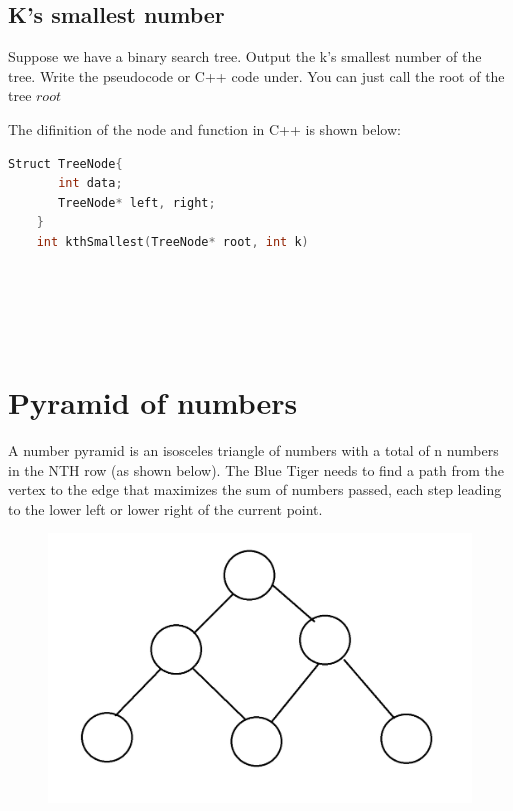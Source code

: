 \documentclass[11pt]{exam}
\begin{document}
    \subsection{K's smallest number}
    Suppose we have a binary search tree. Output the k's smallest number of the tree. Write the pseudocode or C++ code under. You can just call the root of the tree $root$\par 
    The difinition of the node and function in C++ is shown below:\par 
    \begin{lstlisting}[language = C++]
    Struct TreeNode{
       int data;
       TreeNode* left, right; 
    }
    int kthSmallest(TreeNode* root, int k)
    \end{lstlisting}
    
    \begin{solution}
        \\ \hspace*{\fill} \\
        \\ \hspace*{\fill} \\
       
    \end{solution}

\section{Pyramid of numbers}
A number pyramid is an isosceles triangle of numbers with a total of n numbers in the NTH row (as shown below). 
The Blue Tiger needs to find a path from the vertex to the edge that maximizes the sum of numbers passed, 
each step leading to the lower left or lower right of the current point.
\begin{figure}[htbp]
    \centering
    \includegraphics[scale = 1]{number.png}
\end{figure}
\end{document}
